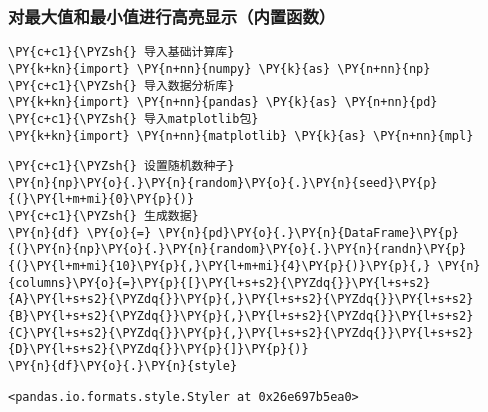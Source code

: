     \hypertarget{ux5bf9ux6700ux5927ux503cux548cux6700ux5c0fux503cux8fdbux884cux9ad8ux4eaeux663eux793aux5185ux7f6eux51fdux6570}{%
\subsubsection{对最大值和最小值进行高亮显示（内置函数）}\label{ux5bf9ux6700ux5927ux503cux548cux6700ux5c0fux503cux8fdbux884cux9ad8ux4eaeux663eux793aux5185ux7f6eux51fdux6570}}

    \begin{tcolorbox}[breakable, size=fbox, boxrule=1pt, pad at break*=1mm,colback=cellbackground, colframe=cellborder]
\begin{Verbatim}[commandchars=\\\{\}]
\PY{c+c1}{\PYZsh{} 导入基础计算库}
\PY{k+kn}{import} \PY{n+nn}{numpy} \PY{k}{as} \PY{n+nn}{np}
\PY{c+c1}{\PYZsh{} 导入数据分析库}
\PY{k+kn}{import} \PY{n+nn}{pandas} \PY{k}{as} \PY{n+nn}{pd}
\PY{c+c1}{\PYZsh{} 导入matplotlib包}
\PY{k+kn}{import} \PY{n+nn}{matplotlib} \PY{k}{as} \PY{n+nn}{mpl}
\end{Verbatim}
\end{tcolorbox}

    \begin{tcolorbox}[breakable, size=fbox, boxrule=1pt, pad at break*=1mm,colback=cellbackground, colframe=cellborder]
\begin{Verbatim}[commandchars=\\\{\}]
\PY{c+c1}{\PYZsh{} 设置随机数种子}
\PY{n}{np}\PY{o}{.}\PY{n}{random}\PY{o}{.}\PY{n}{seed}\PY{p}{(}\PY{l+m+mi}{0}\PY{p}{)}
\PY{c+c1}{\PYZsh{} 生成数据}
\PY{n}{df} \PY{o}{=} \PY{n}{pd}\PY{o}{.}\PY{n}{DataFrame}\PY{p}{(}\PY{n}{np}\PY{o}{.}\PY{n}{random}\PY{o}{.}\PY{n}{randn}\PY{p}{(}\PY{l+m+mi}{10}\PY{p}{,}\PY{l+m+mi}{4}\PY{p}{)}\PY{p}{,} \PY{n}{columns}\PY{o}{=}\PY{p}{[}\PY{l+s+s2}{\PYZdq{}}\PY{l+s+s2}{A}\PY{l+s+s2}{\PYZdq{}}\PY{p}{,}\PY{l+s+s2}{\PYZdq{}}\PY{l+s+s2}{B}\PY{l+s+s2}{\PYZdq{}}\PY{p}{,}\PY{l+s+s2}{\PYZdq{}}\PY{l+s+s2}{C}\PY{l+s+s2}{\PYZdq{}}\PY{p}{,}\PY{l+s+s2}{\PYZdq{}}\PY{l+s+s2}{D}\PY{l+s+s2}{\PYZdq{}}\PY{p}{]}\PY{p}{)}
\PY{n}{df}\PY{o}{.}\PY{n}{style}
\end{Verbatim}
\end{tcolorbox}

            \begin{tcolorbox}[breakable, size=fbox, boxrule=.5pt, pad at break*=1mm, opacityfill=0]
\begin{Verbatim}[commandchars=\\\{\}]
<pandas.io.formats.style.Styler at 0x26e697b5ea0>
\end{Verbatim}
\end{tcolorbox}
        
